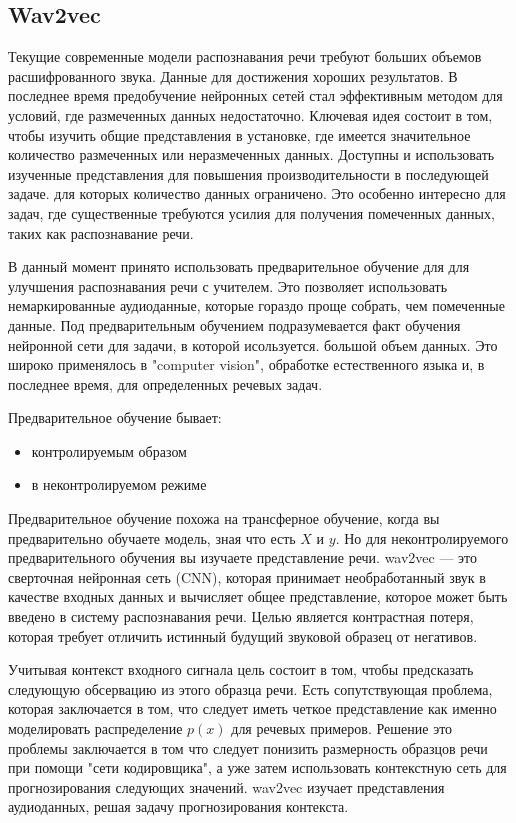 \begin{itemize}
\begin{itemize}
\section{Wav2vec}
Текущие современные модели распознавания речи требуют больших объемов расшифрованного звука.
Данные для достижения хороших результатов. В последнее время предобучение нейронных сетей
стал эффективным методом для условий, где размеченных данных недостаточно. Ключевая идея состоит в том, чтобы
изучить общие представления в установке, где имеется значительное количество размеченных или неразмеченных данных.
Доступны и использовать изученные представления для повышения производительности в последующей задаче.
для которых количество данных ограничено. Это особенно интересно для задач, где существенные
требуются усилия для получения помеченных данных, таких как распознавание речи.

В данный момент принято использовать предварительное обучение для для улучшения распознавания речи с учителем. Это
позволяет использовать немаркированные аудиоданные, которые гораздо проще собрать, чем помеченные данные.
Под предварительным обучением подразумевается факт обучения нейронной сети для задачи, в которой исользуется.
большой объем данных. 
Это широко применялось в "computer vision", обработке естественного языка и, в последнее время, для определенных речевых задач.

Предварительное обучение бывает: 

\begin{itemize}
  \item контролируемым образом
  \item в неконтролируемом режиме
\end{itemize}

Предварительное обучение похожа на трансферное обучение, когда вы предварительно обучаете модель, зная что есть $X$ и $y$.
Но для неконтролируемого предварительного обучения вы изучаете представление речи. 
wav2vec — это сверточная нейронная сеть (CNN), которая принимает необработанный звук 
в качестве входных данных и вычисляет общее представление, 
которое может быть введено в систему распознавания речи. 
Целью является контрастная потеря, которая требует отличить истинный будущий звуковой образец от негативов.

Учитывая контекст входного сигнала цель состоит в том, чтобы предсказать следующую обсервацию из этого образца речи.
Есть сопутствующая проблема, которая заключается в том, что следует иметь четкое представление как именно 
моделировать распределение $p(x)$ для речевых примеров. Решение это проблемы заключается в том что 
следует понизить размерность образцов речи при помощи "сети кодировщика", а уже затем использовать
контекстную сеть для прогнозирования следующих значений. 
wav2vec изучает представления аудиоданных, решая задачу прогнозирования контекста.


\end{itemize}
\end{itemize}
